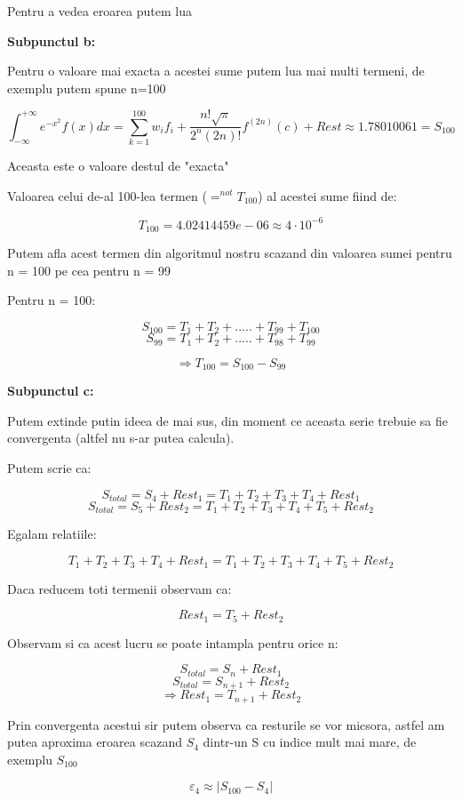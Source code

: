 \documentclass[a4paper,12pt]{article}
\begin{document}
Pentru a vedea eroarea putem lua 


\newpage
\textbf{Subpunctul b:}
\normalsize \bigskip

Pentru o valoare mai exacta a acestei sume putem lua mai multi termeni,
de exemplu putem spune n=100

$$\int_{-\infty}^{+\infty}e^{-x^2}f(x)dx = \sum_{k=1}^{100}w_if_i 
+ \frac{n! \sqrt{\pi}}{2^n (2n)!}f^{(2n)}(c) + Rest \approx 1.78010061 = S_{100}$$

Aceasta este o valoare destul de "exacta"


Valoarea celui de-al 100-lea termen ($=^{not}T_{100}$) al acestei sume fiind de:

$$T_{100} = 4.02414459e-06 \approx 4 \cdot 10^{-6} $$

Putem afla acest termen din algoritmul nostru scazand din valoarea sumei
pentru n = 100 pe cea pentru n = 99

Pentru n = 100:

$$S_{100} = T_1 + T_2 + ..... + T_{99} + T_{100}$$
$$S_{99} = T_1 + T_2 + ..... + T_{98} + T_{99}$$

$$\Rightarrow T_{100} = S_{100} - S_{99}$$

\bigskip
\textbf{Subpunctul c:}
\normalsize \bigskip

Putem extinde putin ideea de mai sus, din moment ce aceasta serie trebuie
sa fie convergenta (altfel nu s-ar putea calcula).

Putem scrie ca:

$$S_{total} = S_{4} + Rest_1 = T_1 + T_2 + T_3 + T_4 + Rest_1$$
$$S_{total} = S_{5} + Rest_2 = T_1 + T_2 + T_3 + T_4 + T_5 + Rest_2$$

Egalam relatiile:

$$ T_1 + T_2 + T_3 + T_4 + Rest_1 = T_1 + T_2 + T_3 + T_4 + T_5 + Rest_2$$


Daca reducem toti termenii observam ca:

$$Rest_1 = T_5 + Rest_2$$

\newpage
Observam si ca acest lucru se poate intampla pentru orice n:

$$S_{total} = S_{n} + Rest_1$$
$$S_{total} = S_{n+1} + Rest_2$$
$$\Rightarrow Rest_1 = T_{n+1} + Rest_2$$


Prin convergenta acestui sir putem observa ca resturile se vor micsora,
astfel am putea aproxima eroarea scazand $S_{4}$ dintr-un S cu indice mult 
mai mare, de exemplu $S_{100}$

$$\varepsilon_4 \approx |S_{100} - S_{4}|$$
\end{document}
